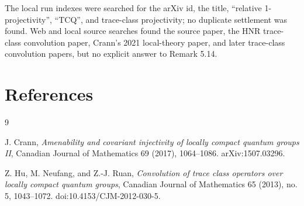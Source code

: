 \documentclass[11pt]{amsart}
\theoremstyle{remark}
\begin{document}
The local run indexes were searched for the arXiv id, the title, ``relative 1-projectivity'', ``TCQ'', and trace-class projectivity; no duplicate settlement was found.  Web and local source searches found the source paper, the HNR trace-class convolution paper, Crann's 2021 local-theory paper, and later trace-class convolution papers, but no explicit answer to Remark 5.14.

\section{References}

\begin{thebibliography}{9}

J. Crann,
\emph{Amenability and covariant injectivity of locally compact quantum groups II},
Canadian Journal of Mathematics 69 (2017), 1064--1086.
arXiv:1507.03296.

Z. Hu, M. Neufang, and Z.-J. Ruan,
\emph{Convolution of trace class operators over locally compact quantum groups},
Canadian Journal of Mathematics 65 (2013), no. 5, 1043--1072.
doi:10.4153/CJM-2012-030-5.

\end{thebibliography}
\end{document}
